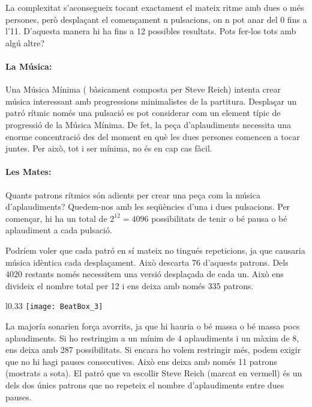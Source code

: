La complexitat s'aconsegueix tocant exactament el mateix ritme amb dues o més persones, però desplaçant el començament n pulsacions, on n pot anar del 0 fins a l'11. D'aquesta manera hi ha fins a 12 possibles resultats. Pots fer-los tots amb algú altre?

\paragraph{La Música:}
Una Música Mínima ( bàsicament composta per Steve Reich) intenta crear música interessant amb progressions minimalistes de la partitura. Desplaçar un patró rítmic només una pulsació es pot considerar com un element típic de progressió de la Música Mínima. De fet, la peça d'aplaudiments necessita una enorme concentració des del moment en què les dues persones comencen a tocar juntes. Per això, tot i ser mínima, no és en cap cas fàcil.

\paragraph{Les Mates:}
Quants patrons rítmics són adients per crear una peça com la música d'aplaudiments? Quedem-nos amb les seqüències d'una i dues pulsacions. Per començar, hi ha un total de $2^{12} = 4096$ possibilitats de tenir o bé pausa o bé aplaudiment a cada pulsació.

Podríem voler que cada patró en sí mateix no tingués repeticions, ja que causaria música idèntica cada desplaçament. Això descarta 76 d'aquests patrons. Dels 4020 restants només necessitem una versió desplaçada de cada un. Això ens divideix el nombre total per 12 i ens deixa amb només 335 patrons.

\begin{wrapfigure}[14]{l}{0.33\textwidth}
\centering
\texttt{[image: BeatBox\_3]}
\end{wrapfigure}

La majoría sonarien força avorrits, ja que hi hauria o bé massa o bé massa pocs aplaudiments. Si ho restringim a un mínim de 4 aplaudiments i un màxim de 8, ens deixa amb 287 possibilitats. Si encara ho volem restringir més, podem exigir que no hi hagi pauses consecutives. Això ens deixa amb només 11 patrons (mostrats a sota). El patró que va escollir Steve Reich (marcat en vermell) és un dels dos únics patrons que no repeteix el nombre d'aplaudiments entre dues pauses.


